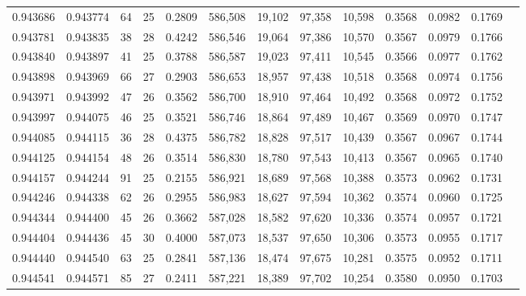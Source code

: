 \begin{tabular}{rrrrrrrrrrrrr}
0.943686 & 0.943774 &    64 &  25 &                                     0.2809 & 586,508 &  19,102 &  97,358 &  10,598 & 0.3568 & 0.0982 & 0.1769 \\
0.943781 & 0.943835 &    38 &  28 &                                     0.4242 & 586,546 &  19,064 &  97,386 &  10,570 & 0.3567 & 0.0979 & 0.1766 \\
0.943840 & 0.943897 &    41 &  25 &                                     0.3788 & 586,587 &  19,023 &  97,411 &  10,545 & 0.3566 & 0.0977 & 0.1762 \\
0.943898 & 0.943969 &    66 &  27 &                                     0.2903 & 586,653 &  18,957 &  97,438 &  10,518 & 0.3568 & 0.0974 & 0.1756 \\
0.943971 & 0.943992 &    47 &  26 &                                     0.3562 & 586,700 &  18,910 &  97,464 &  10,492 & 0.3568 & 0.0972 & 0.1752 \\
0.943997 & 0.944075 &    46 &  25 &                                     0.3521 & 586,746 &  18,864 &  97,489 &  10,467 & 0.3569 & 0.0970 & 0.1747 \\
0.944085 & 0.944115 &    36 &  28 &                                     0.4375 & 586,782 &  18,828 &  97,517 &  10,439 & 0.3567 & 0.0967 & 0.1744 \\
0.944125 & 0.944154 &    48 &  26 &                                     0.3514 & 586,830 &  18,780 &  97,543 &  10,413 & 0.3567 & 0.0965 & 0.1740 \\
0.944157 & 0.944244 &    91 &  25 &                                     0.2155 & 586,921 &  18,689 &  97,568 &  10,388 & 0.3573 & 0.0962 & 0.1731 \\
0.944246 & 0.944338 &    62 &  26 &                                     0.2955 & 586,983 &  18,627 &  97,594 &  10,362 & 0.3574 & 0.0960 & 0.1725 \\
0.944344 & 0.944400 &    45 &  26 &                                     0.3662 & 587,028 &  18,582 &  97,620 &  10,336 & 0.3574 & 0.0957 & 0.1721 \\
0.944404 & 0.944436 &    45 &  30 &                                     0.4000 & 587,073 &  18,537 &  97,650 &  10,306 & 0.3573 & 0.0955 & 0.1717 \\
0.944440 & 0.944540 &    63 &  25 &                                     0.2841 & 587,136 &  18,474 &  97,675 &  10,281 & 0.3575 & 0.0952 & 0.1711 \\
0.944541 & 0.944571 &    85 &  27 &                                     0.2411 & 587,221 &  18,389 &  97,702 &  10,254 & 0.3580 & 0.0950 & 0.1703 \\

\end{tabular}
